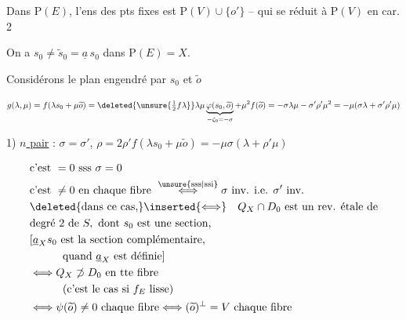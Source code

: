 Dans $\mathrm P(E)$, l'ens des pts fixes est $\mathrm P(V)\cup\{o'\}$ -- qui se réduit à $\mathrm P(V)$ en car. 2

On a $s_0\ne\widetilde{s}_0=\underline a\,s_0$ dans $\mathrm P(E)=X$.

Considérons le  plan engendré par $s_0$ et $\widetilde{o}$ 

\[
g(\lambda,\mu)=f(\lambda s_0+\mu\widetilde{o})=\deleted{\unsure{\tfrac12 f\lambda}}\lambda\mu\underbrace{\varphi(s_0,\widetilde{o})}_{-\zeta_0=-\sigma}+\mu^2 f(\widetilde{o})=-\sigma\lambda\mu-\sigma'\rho'\mu^2=-\mu(\sigma\lambda+\sigma'\rho'\mu)
\]

1) \uline{$n$ pair} : $\sigma=\sigma'$, $\rho=2\rho'$\qquad $f(\lambda s_0+\mu\widetilde{o})=-\mu\sigma(\lambda+\rho'\mu)$


\[
\begin{aligned}
&\text{c'est }=0\text{ sss }\sigma=0\\
&\text{c'est }\ne0\text{ en chaque fibre }\overset{\unsure{\text{sss}|\text{ssi}}}{\Longleftrightarrow}\sigma\ \text{inv. i.e. }\sigma'\ \text{inv.}\\
&\deleted{\text{dans ce cas,}}\inserted{\Longleftrightarrow}\quad Q_X\cap D_0\ \text{est un rev. étale de}\\
&\text{degré 2 de }S,\text{ dont }s_0\text{ est une section,}\\
&[\underline a_X s_0\text{ est la section complémentaire,}\\
&\hspace{3em}\text{quand }\underline a_X\text{ est définie}]\\
&\Longleftrightarrow Q_X\not\supset D_0\ \text{en tte fibre}\\
&\hspace{3em}(\text{c'est le cas si }f_E\ \text{lisse})\\
&\Longleftrightarrow\psi(\widetilde{o})\ne0\ \text{chaque fibre}\Longleftrightarrow(\widetilde{o})^\perp=V\ \text{chaque fibre}
\end{aligned}
\]

